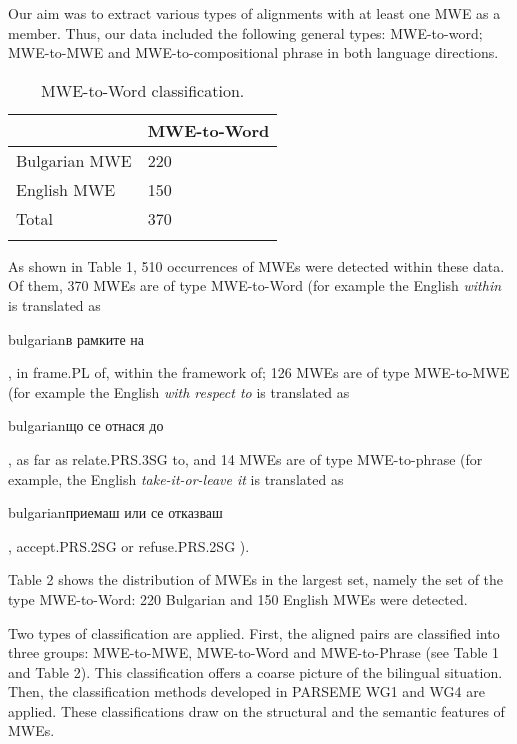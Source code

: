 \documentclass[output=paper]{langsci/langscibook}
\begin{document}
Our aim was to extract various types of alignments with at least one
MWE as a member. Thus, our data included the following general types:
MWE-to-word; MWE-to-MWE and MWE-to-compositional phrase in both language directions.



\begin{table}[ht]
\centering
\begin{tabular}{p{3.0cm}p{3.0cm}}
\lsptoprule
& \textbf{MWE-to-Word }\\
\midrule
Bulgarian MWE & 220 \\
English MWE & 150 \\\hline
Total & 370 \\%
\lspbottomrule
\end{tabular}
 \caption{MWE-to-Word classification.}
\end{table}


As shown in Table 1, 510 occurrences of MWEs were detected within these
data. Of them, 370 MWEs are of type MWE-to-Word (for example the English
\textit{within} is translated as \begin{otherlanguage*}{bulgarian}в
рамките на\end{otherlanguage*}, in frame.\textsc{PL} of, within the
framework of; 126 MWEs are of type MWE-to-MWE (for example the English
\textit{with respect to} is translated as \begin{otherlanguage*}{bulgarian}що
се отнася до\end{otherlanguage*}, as far as relate.\textsc{PRS.3SG} to,
and 14 MWEs are of type MWE-to-phrase (for example, the English
\textit{take-it-or-leave it} is translated as
\begin{otherlanguage*}{bulgarian}приемаш или се
отказваш\end{otherlanguage*}, accept.\textsc{PRS.2SG} or refuse.\textsc{PRS.2SG} ).

Table 2 shows the distribution of MWEs in the largest set, namely the set of
the type MWE-to-Word: 220 Bulgarian and 150 English MWEs were detected.


Two types of classification are applied. First,  
the aligned pairs are classified into three groups: MWE-to-MWE, MWE-to-Word and
MWE-to-Phrase (see Table 1 and Table 2). This classification offers a coarse picture of the bilingual
situation. Then, the classification methods developed in PARSEME WG1 and WG4 are applied. These classifications draw on the structural and
the semantic features of MWEs.
\end{document}
